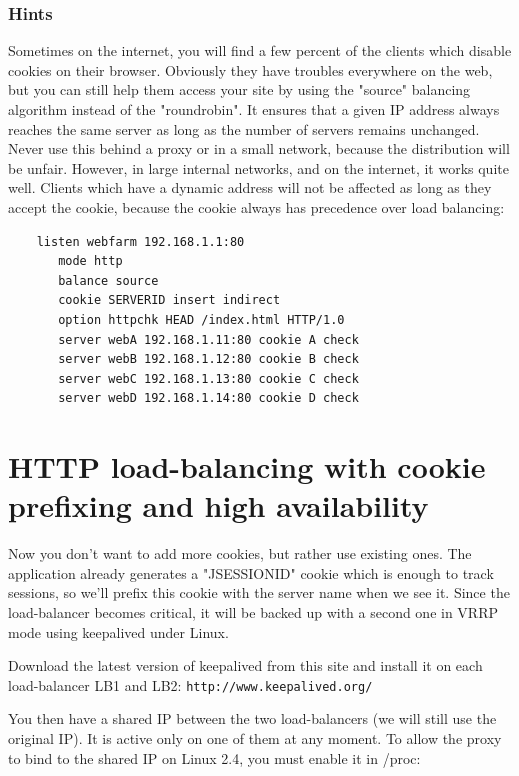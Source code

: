 \subsubsection{Hints}

Sometimes on the internet, you will find a few percent of the clients which
disable cookies on their browser. Obviously they have troubles everywhere on
the web, but you can still help them access your site by using the "source"
balancing algorithm instead of the "roundrobin". It ensures that a given IP
address always reaches the same server as long as the number of servers remains
unchanged. Never use this behind a proxy or in a small network, because the
distribution will be unfair. However, in large internal networks, and on the
internet, it works quite well. Clients which have a dynamic address will not
be affected as long as they accept the cookie, because the cookie always has
precedence over load balancing:

\begin{verbatim}
    listen webfarm 192.168.1.1:80
       mode http
       balance source
       cookie SERVERID insert indirect
       option httpchk HEAD /index.html HTTP/1.0
       server webA 192.168.1.11:80 cookie A check
       server webB 192.168.1.12:80 cookie B check
       server webC 192.168.1.13:80 cookie C check
       server webD 192.168.1.14:80 cookie D check
\end{verbatim}

\section{HTTP load-balancing with cookie prefixing and high availability}
\label{sec:http_load_balancing_with_cookie_prefixing_and_high_aviability}

Now you don't want to add more cookies, but rather use existing ones. The
application already generates a "JSESSIONID" cookie which is enough to track
sessions, so we'll prefix this cookie with the server name when we see it.
Since the load-balancer becomes critical, it will be backed up with a second
one in VRRP mode using keepalived under Linux.

Download the latest version of keepalived from this site and install it
on each load-balancer LB1 and LB2:
\verb|http://www.keepalived.org/|

You then have a shared IP between the two load-balancers (we will still use the
original IP). It is active only on one of them at any moment. To allow the
proxy to bind to the shared IP on Linux 2.4, you must enable it in /proc:

